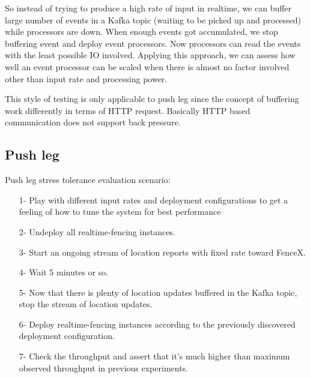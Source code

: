\documentclass[a4]{report}
\begin{document}
    So instead of trying to produce a high rate of input in realtime, we can buffer large number of events in a Kafka
    topic (waiting to be picked up and processed) while processors are down.
    When enough events got accumulated, we stop buffering event and deploy event processors.
    Now processors can read the events with the least possible IO involved.
    Applying this approach, we can assess how well an event processor can be scaled when there is almost no factor
    involved other than input rate and processing power.

    This style of testing is only applicable to push leg since the concept of buffering work differently in terms of
    HTTP request.
    Basically HTTP based communication does not support back pressure.

    \subsection{Push leg}
    Push leg stress tolerance evaluation scenario:
    \begin{itemize}
        \item[1-] Play with different input rates and deployment configurations to get a feeling of how to tune the
        system for best performance
        \item[2-] Undeploy all realtime-fencing instances.
        \item[3-] Start an ongoing stream of location reports with fixed rate toward FenceX.
        \item[4-] Wait 5 minutes or so.
        \item[5-] Now that there is plenty of location updates buffered in the Kafka topic, stop the stream of
        location updates.
        \item[6-] Deploy realtime-fencing instances according to the previously discovered deployment configuration.
        \item[7-] Check the throughput and assert that it's much higher than maximum observed throughput in
        previous experiments.
    \end{itemize}
\end{document}
